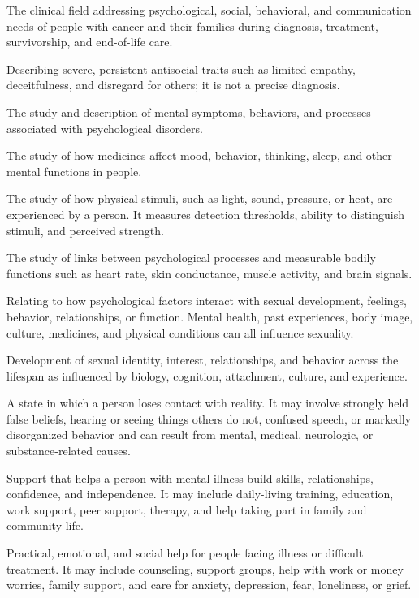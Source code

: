  The clinical field addressing psychological, social, behavioral, and communication needs of people with cancer and their families during diagnosis, treatment, survivorship, and end-of-life care.

 Describing severe, persistent antisocial traits such as limited empathy, deceitfulness, and disregard for others; it is not a precise diagnosis.

 The study and description of mental symptoms, behaviors, and processes associated with psychological disorders.

 The study of how medicines affect mood, behavior, thinking, sleep, and other mental functions in people.

 The study of how physical stimuli, such as light, sound, pressure, or heat, are experienced by a person. It measures detection thresholds, ability to distinguish stimuli, and perceived strength.

 The study of links between psychological processes and measurable bodily functions such as heart rate, skin conductance, muscle activity, and brain signals.

 Relating to how psychological factors interact with sexual development, feelings, behavior, relationships, or function. Mental health, past experiences, body image, culture, medicines, and physical conditions can all influence sexuality.

 Development of sexual identity, interest, relationships, and behavior across the lifespan as influenced by biology, cognition, attachment, culture, and experience.

 A state in which a person loses contact with reality. It may involve strongly held false beliefs, hearing or seeing things others do not, confused speech, or markedly disorganized behavior and can result from mental, medical, neurologic, or substance-related causes.

 Support that helps a person with mental illness build skills, relationships, confidence, and independence. It may include daily-living training, education, work support, peer support, therapy, and help taking part in family and community life.

 Practical, emotional, and social help for people facing illness or difficult treatment. It may include counseling, support groups, help with work or money worries, family support, and care for anxiety, depression, fear, loneliness, or grief.

